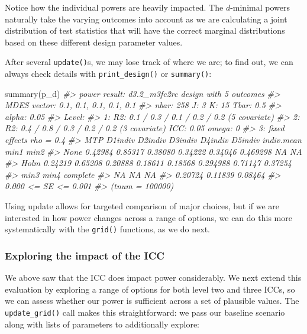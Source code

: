 \documentclass[
]{article}
\newenvironment{Shaded}{\begin{snugshade}}{\end{snugshade}}
\newcommand{\CommentTok}[1]{\textcolor[rgb]{0.56,0.35,0.01}{\textit{#1}}}
\newcommand{\FunctionTok}[1]{\textcolor[rgb]{0.00,0.00,0.00}{#1}}
\newcommand{\NormalTok}[1]{#1}
\begin{document}
Notice how the individual powers are heavily impacted. The \(d\)-minimal
powers naturally take the varying outcomes into account as we are
calculating a joint distribution of test statistics that will have the
correct marginal distributions based on these different design parameter
values.

After several \texttt{update()}s, we may lose track of where we are; to
find out, we can always check details with \texttt{print\_design()} or
\texttt{summary()}:

\begin{Shaded}
\begin{Highlighting}[]
\FunctionTok{summary}\NormalTok{(p\_d)}
\CommentTok{\#\textgreater{} power result: d3.2\_m3fc2rc design with 5 outcomes}
\CommentTok{\#\textgreater{}   MDES vector: 0.1, 0.1, 0.1, 0.1, 0.1}
\CommentTok{\#\textgreater{}   nbar: 258  J: 3    K: 15   Tbar: 0.5}
\CommentTok{\#\textgreater{}   alpha: 0.05    }
\CommentTok{\#\textgreater{}   Level:}
\CommentTok{\#\textgreater{}     1: R2: 0.1 / 0.3 / 0.1 / 0.2 / 0.2 (5 covariate)}
\CommentTok{\#\textgreater{}     2: R2: 0.4 / 0.8 / 0.3 / 0.2 / 0.2 (3 covariate) ICC: 0.05   omega: 0}
\CommentTok{\#\textgreater{}     3:   fixed effects    rho = 0.4}
\CommentTok{\#\textgreater{}   MTP D1indiv D2indiv D3indiv D4indiv D5indiv indiv.mean    min1    min2}
\CommentTok{\#\textgreater{}  None 0.42984 0.85317 0.38080 0.34222 0.34046   0.469298      NA      NA}
\CommentTok{\#\textgreater{}  Holm 0.24219 0.65208 0.20888 0.18611 0.18568   0.294988 0.71147 0.37254}
\CommentTok{\#\textgreater{}     min3    min4 complete}
\CommentTok{\#\textgreater{}       NA      NA       NA}
\CommentTok{\#\textgreater{}  0.20724 0.11839  0.08464}
\CommentTok{\#\textgreater{}  0.000 \textless{}= SE \textless{}= 0.001}
\CommentTok{\#\textgreater{}  (tnum = 100000)}
\end{Highlighting}
\end{Shaded}

Using update allows for targeted comparison of major choices, but if we
are interested in how power changes across a range of options, we can do
this more systematically with the \texttt{grid()} functions, as we do
next.

\subsubsection{Exploring the impact of the ICC}

We above saw that the ICC does impact power considerably. We next extend
this evaluation by exploring a range of options for both level two and
three ICCs, so we can assess whether our power is sufficient across a
set of plausible values. The \texttt{update\_grid()} call makes this
straightforward: we pass our baseline scenario along with lists of
parameters to additionally explore:
\end{document}
